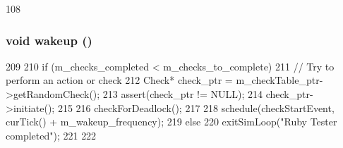 \begin{DoxyCode}
108 {}
\end{DoxyCode}
\hypertarget{classRubyTester_ae674290a26ecbd622c5160e38e8a4fe9}{
\subsubsection[{wakeup}]{\setlength{\rightskip}{0pt plus 5cm}void wakeup ()}}
\label{classRubyTester_ae674290a26ecbd622c5160e38e8a4fe9}



\begin{DoxyCode}
209 {
210     if (m_checks_completed < m_checks_to_complete) {
211         // Try to perform an action or check
212         Check* check_ptr = m_checkTable_ptr->getRandomCheck();
213         assert(check_ptr != NULL);
214         check_ptr->initiate();
215 
216         checkForDeadlock();
217 
218         schedule(checkStartEvent, curTick() + m_wakeup_frequency);
219     } else {
220         exitSimLoop("Ruby Tester completed");
221     }
222 }
\end{DoxyCode}


